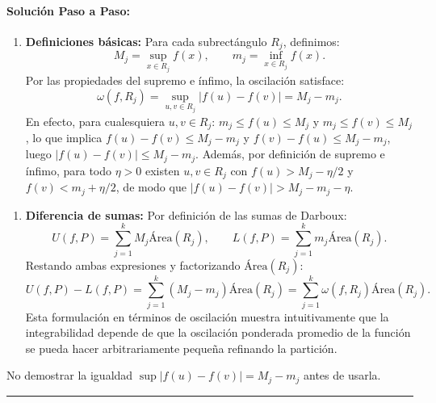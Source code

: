 \documentclass[11pt,a4paper]{article}
\begin{document}
\paragraph{Solución Paso a Paso:}\par
\begin{enumerate}[label=\textbf{\arabic*.}]
\item \textbf{Definiciones básicas:}
Para cada subrectángulo $R_j$, definimos:
\begin{equation*}
M_j = \sup_{x \in R_j} f(x), \qquad m_j = \inf_{x \in R_j} f(x).
\end{equation*}
Por las propiedades del supremo e ínfimo, la oscilación satisface:
\begin{equation*}
\omega(f, R_j) = \sup_{u, v \in R_j} |f(u) - f(v)| = M_j - m_j.
\end{equation*}
En efecto, para cualesquiera $u, v \in R_j$: $m_j \le f(u) \le M_j$ y $m_j \le f(v) \le M_j$, lo que implica $f(u) - f(v) \le M_j - m_j$ y $f(v) - f(u) \le M_j - m_j$, luego $|f(u) - f(v)| \le M_j - m_j$.
Además, por definición de supremo e ínfimo, para todo $\eta > 0$ existen $u, v \in R_j$ con $f(u) > M_j - \eta/2$ y $f(v) < m_j + \eta/2$, de modo que $|f(u) - f(v)| > M_j - m_j - \eta$.
\end{enumerate}

\begin{enumerate}[label=\textbf{\arabic*.}]
\item \textbf{Diferencia de sumas:}
Por definición de las sumas de Darboux:
\begin{equation*}
U(f, P) = \sum_{j=1}^k M_j \text{Área}(R_j), \qquad L(f, P) = \sum_{j=1}^k m_j \text{Área}(R_j).
\end{equation*}
Restando ambas expresiones y factorizando $\text{Área}(R_j)$:
\begin{equation*}
U(f, P) - L(f, P) = \sum_{j=1}^k (M_j - m_j) \text{Área}(R_j) = \sum_{j=1}^k \omega(f, R_j) \text{Área}(R_j).
\end{equation*}
Esta formulación en términos de oscilación muestra intuitivamente que la integrabilidad depende de que la oscilación ponderada promedio de la función se pueda hacer arbitrariamente pequeña refinando la partición.
\end{enumerate}

\begin{trapbox}
No demostrar la igualdad $\sup |f(u)-f(v)| = M_j - m_j$ antes de usarla.
\end{trapbox}

\vspace{0.5cm}
\hrule
\vspace{0.5cm}
\end{document}
